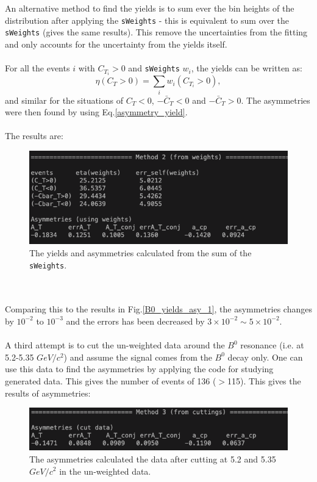 \\
\\
An alternative method to find the yields is to sum ever the bin heights of the distribution after applying the \texttt{sWeights} - this is equivalent to sum over the \texttt{sWeights} (gives the same results). This remove the uncertainties from the fitting and only accounts for the uncertainty from the yields itself.
\\
\\
For all the events $i$ with $C_{T_{i}} > 0$ and \texttt{sWeights} $w_i$, the yields can be written as:
\begin{equation}
    \eta(C_T > 0) = \sum_{i} w_i (C_{T_{i}} > 0),
\end{equation}
and similar for the situations of $C_T<0$, $-\bar{C}_T<0$ and $-\bar{C}_T>0$. The asymmetries were then found by using Eq.\ref{asymmetry_yield}.
\\
\\
The results are:
\begin{figure}[h]
\center
\includegraphics*[width=0.76\linewidth]{LHCb_runI/B0_yields_asy2}
\caption{The yields and asymmetries calculated from the sum of the \texttt{sWeights}.}
\label{B0_yields_asy_2}
\end{figure}
\\
\\
Comparing this to the results in Fig.\ref{B0_yields_asy_1}, the asymmetries changes by $10^{-2}$ to $10^{-3}$ and the errors has been decreased by $3\times 10^{-2} \sim 5\times 10^{-2}$. 
\\
\\
A third attempt is to cut the un-weighted data around the $B^0$ resonance (i.e. at 5.2-5.35 $GeV/c^2$) and assume the signal comes from the $B^0$ decay only. One can use this data to find the asymmetries by applying the code for studying generated data. This gives the number of events of 136 ($>$115). This gives the results of asymmetries: 
\begin{figure}[h]
\center
\includegraphics*[width=0.76\linewidth]{LHCb_runI/B0_yields_asy3}
\caption{The asymmetries calculated the data after cutting at 5.2 and 5.35 $GeV/c^2$ in the un-weighted data.}
\label{B0_yields_asy_3}
\end{figure}
